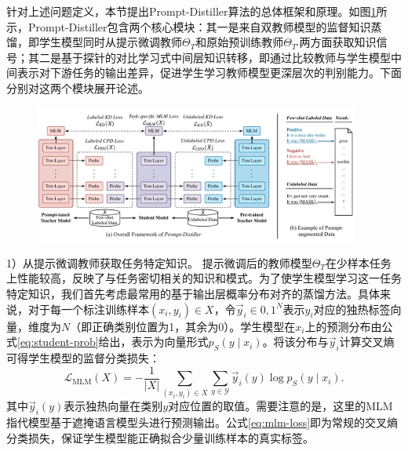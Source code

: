 \documentclass[../main.tex]{subfiles}
\begin{document}
\label{sec:ch3-3-prompt-distiller-framework}
针对上述问题定义，本节提出Prompt-Distiller算法的总体框架和原理。如图\ref{fig:PromptDistillerFramework}所示，Prompt-Distiller包含两个核心模块：其一是来自双教师模型的监督知识蒸馏，即学生模型同时从提示微调教师$\Theta_T$和原始预训练教师$\Theta_{T'}$两方面获取知识信号；其二是基于探针的对比学习式中间层知识转移，即通过比较教师与学生模型中间表示对下游任务的输出差异，促进学生学习教师模型更深层次的判别能力。下面分别对这两个模块展开论述。

\begin{figure}[htbp]
	\centering
	\includegraphics[width=0.95\textwidth]{Prompt-Distiller/framework.pdf}
	\label{fig:PromptDistillerFramework}
\end{figure}

\label{sec:ch3-3-1-dual-teacher-distillation-strategy}
1）从提示微调教师获取任务特定知识。 提示微调后的教师模型$\Theta_T$在少样本任务上性能较高，反映了与任务密切相关的知识和模式。为了使学生模型学习这一任务特定知识，我们首先考虑最常用的基于输出层概率分布对齐的蒸馏方法。具体来说，对于每一个标注训练样本$(x_i, y_i) \in X$，令$\vec{y}_i \in {0,1}^N$表示$y_i$对应的独热标签向量，维度为$N$（即正确类别位置为1，其余为0）。学生模型在$x_i$上的预测分布由公式\eqref{eq:student-prob}给出，表示为向量形式$p_S(y\mid x_i)$。将该分布与$\vec{y}_i$计算交叉熵可得学生模型的监督分类损失：
\begin{equation}
	\label{eq:mlm-loss}
	\mathcal{L}_{\text{MLM}}(X) = -\frac{1}{|X|} \sum_{(x_i, y_i)\in X} \sum_{y \in \mathcal{Y}} \vec{y}_i(y)\log p_S(y \mid x_i) .
\end{equation}
其中$\vec{y}_i(y)$表示独热向量在类别$y$对应位置的取值。需要注意的是，这里的MLM指代模型基于遮掩语言模型头进行预测输出。公式\eqref{eq:mlm-loss}即为常规的交叉熵分类损失，保证学生模型能正确拟合少量训练样本的真实标签。
\end{document}
